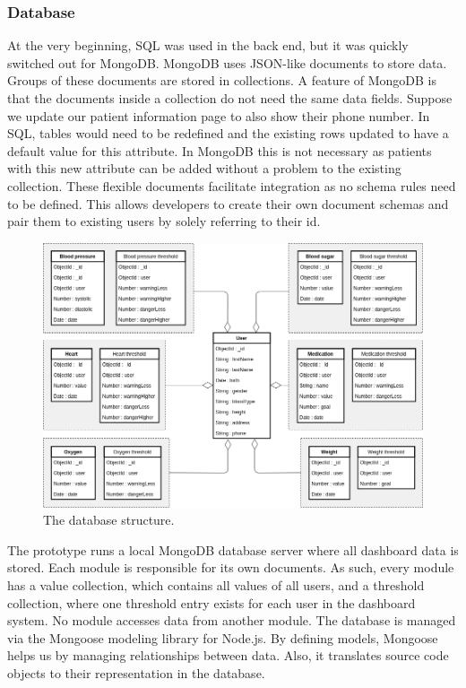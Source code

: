         \subsubsection{Database}

        At the very beginning, SQL was used in the back end, but it was quickly switched out for MongoDB. MongoDB uses JSON-like documents to store data. Groups of these documents are stored in collections. A feature of MongoDB is that the documents inside a collection do not need the same data fields. Suppose we update our patient information page to also show their phone number. In SQL, tables would need to be redefined and the existing rows updated to have a default value for this attribute. In MongoDB this is not necessary as  patients with this new attribute can be added without a problem to the existing collection. These flexible documents facilitate integration as no schema rules need to be defined. This allows developers to create their own document schemas and pair them to existing users by solely referring to their id. 

        \begin{figure}[!t]
            \centering
            \includegraphics[width=1.0\textwidth]{chapters/4_implementation/db}
            \caption{The database structure.}\label{fig:db}
        \end{figure}

        The prototype runs a local MongoDB database server where all dashboard data is stored. Each module is responsible for its own documents. As such, every module has a value collection, which contains all values of all users, and a threshold collection, where one threshold entry exists for each user in the dashboard system. No module accesses data from another module. The database is managed via the Mongoose modeling library for Node.js. By defining models, Mongoose helps us by managing relationships between data. Also, it translates source code objects to their representation in the database.

